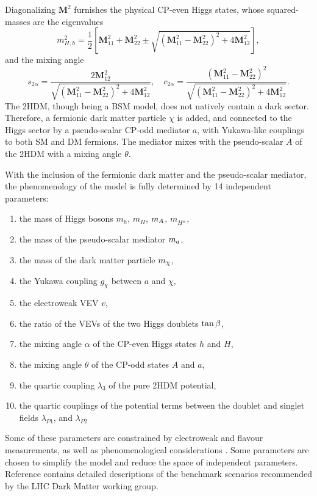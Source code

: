 Diagonalizing $\mathbf{M}^2$ furnishes the physical CP-even Higgs states, whose squared-masses are the eigenvalues
\begin{equation}
    \label{4.7}
    m^2_{H,h} = \frac{1}{2}\left[ \mathbf{M}^2_{11} + \mathbf{M}^2_{22} \pm \sqrt{(\mathbf{M}^2_{11} - \mathbf{M}^2_{22})^2 + 4\mathbf{M}^2_{12}} \right],
\end{equation}
and the mixing angle 
\begin{equation}
    \label{4.8}
    s_{2\alpha} = \frac{2\mathbf{M}^2_{12}}{\sqrt{(\mathbf{M}^2_{11} - \mathbf{M}^2_{22})^2 + 4\mathbf{M}^2_{12}}} , \quad c_{2\alpha} = \frac{(\mathbf{M}^2_{11} - \mathbf{M}^2_{22})^2}{\sqrt{(\mathbf{M}^2_{11} - \mathbf{M}^2_{22})^2 + 4\mathbf{M}^2_{12}}}.
\end{equation}
The 2HDM, though being a BSM model, does not natively contain a dark sector. 
Therefore, a fermionic dark matter particle $\chi$ is added, and connected to the Higgs sector by a pseudo-scalar CP-odd mediator $a$, 
with Yukawa-like couplings to both SM and DM fermions. 
The mediator mixes with the pseudo-scalar $A$ of the 2HDM with a mixing angle $\theta$. 

With the inclusion of the fermionic dark matter and the pseudo-scalar mediator, the phenomenology of the model is fully determined by 14 independent parameters:
\begin{enumerate}
    \item the mass of Higgs bosons $m_h$, $m_H$, $m_A$, $m_{H^{\pm}}$,
    \item the mass of the pseudo-scalar mediator $m_a$,
    \item the mass of the dark matter particle $m_{\chi}$,
    \item the Yukawa coupling $g_{\chi}$ between $a$ and $\chi$,
    \item the electroweak VEV $v$,
    \item the ratio of the VEVs of the two Higgs doublets $\tan\beta$,
    \item the mixing angle $\alpha$ of the CP-even Higgs states $h$ and $H$,
    \item the mixing angle $\theta$ of the CP-odd states $A$ and $a$,
    \item the quartic coupling $\lambda_3$ of the pure 2HDM potential,
    \item the quartic couplings of the potential terms between the doublet and singlet fields $\lambda_{P1}$, and $\lambda_{P2}$
\end{enumerate}
Some of these parameters are constrained by electroweak and flavour measurements, as well as phenomenological considerations \cite{Bauer:2017ota,2HDMWGproxi}. 
Some parameters are chosen to simplify the model and reduce the space of independent parameters. 
Reference \cite{2HDMWGproxi} contains detailed descriptions of the \thdma benchmark scenarios recommended by the LHC Dark Matter working group. 


